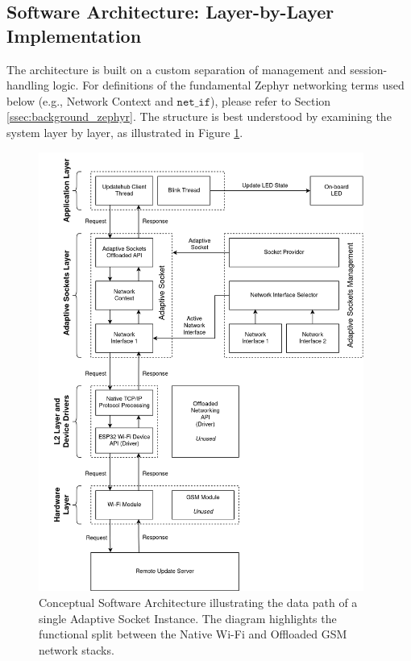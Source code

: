 \subsection{Software Architecture: Layer-by-Layer Implementation}
\label{ssec:software_implementation}

The architecture is built on a custom separation of management and session-handling logic. For definitions of the fundamental Zephyr networking terms used below (e.g., Network Context and $\texttt{net\_if}$), please refer to Section \ref{ssec:background_zephyr}. The structure is best understood by examining the system layer by layer, as illustrated in Figure \ref{fig:software-arch}.

\begin{figure}[H]
    \centering
    \includegraphics[width=0.95\textwidth]{"images/software-architecture.png"}
    \caption{Conceptual Software Architecture illustrating the data path of a single Adaptive Socket Instance. The diagram highlights the functional split between the Native Wi-Fi and Offloaded GSM network stacks.}
    \label{fig:software-arch}
\end{figure}


